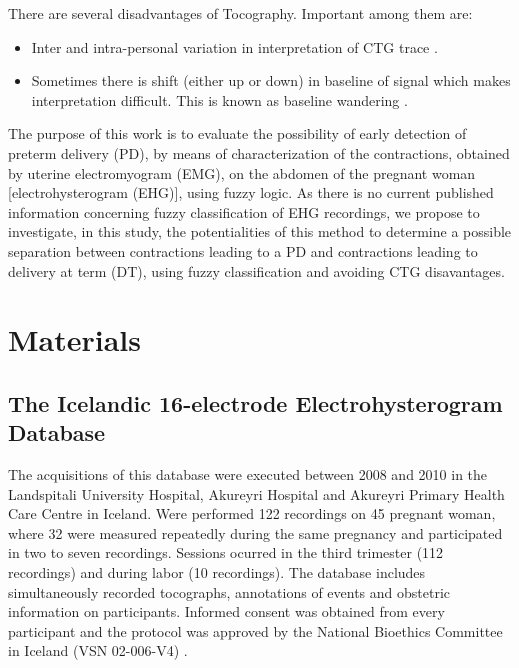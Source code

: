 \documentclass[bioengineering,article,submit,moreauthors,pdftex,10pt,a4paper]{mdpi}
\begin{document}
 There are several disadvantages of Tocography. Important
 among them are:
 
 \begin{itemize}[leftmargin=*,labelsep=5.8mm]
 	\item	Inter and intra-personal variation in interpretation of CTG
 	trace \cite{ref-bernardes}.
 	\item	Sometimes there is shift (either up or down) in baseline of
 	signal which makes interpretation difficult. This is known as
 	baseline wandering \cite{ref-marques}. 	
 \end{itemize}
 
 The purpose of this work is to evaluate the possibility of early detection of preterm delivery (PD), by means
 of characterization of the contractions, obtained by uterine
 electromyogram (EMG), on the abdomen of the pregnant
 woman [electrohysterogram (EHG)], using fuzzy logic. As there is no current
 published information concerning fuzzy classification of EHG recordings, we propose to investigate, in this study, the potentialities of this method to determine a possible separation between contractions leading to a PD and contractions leading to
 delivery at term (DT), using fuzzy classification and avoiding CTG disavantages.





\section{Materials}

\subsection{The Icelandic 16-electrode	Electrohysterogram Database}


The acquisitions of this database were executed between 2008 and 2010 in the Landspitali University Hospital, Akureyri Hospital and Akureyri Primary Health Care Centre in Iceland. Were performed 122 recordings on 45 pregnant woman, where 32 were measured repeatedly during
the same pregnancy and participated in two to seven recordings. Sessions ocurred in the third
trimester (112 recordings) and during labor (10 recordings). The database includes simultaneously recorded tocographs, annotations of events and obstetric information on participants. Informed consent was obtained from every participant and the protocol was approved by the National
Bioethics Committee in Iceland (VSN 02-006-V4) \cite{ref-islddatabase}.
\end{document}
